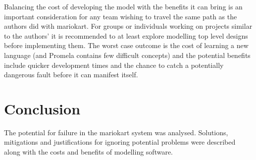 Balancing the cost of developing the model with the benefits it can bring is an important
consideration for any team wishing to travel the same path as the authors did with 
mariokart. For groups or individuals working on projects similar to the authors' it is recommended to
at least explore modelling top level designs before implementing them. The worst case outcome
is the cost of learning a new language (and Promela contains few difficult concepts) and the potential
benefits include quicker development times and the chance to catch a potentially dangerous fault
before it can manifest itself.

\section{Conclusion}
The potential for failure in the mariokart system was analysed. Solutions, mitigations and justifications
for ignoring potential problems were described along with the costs and benefits of modelling software. 
